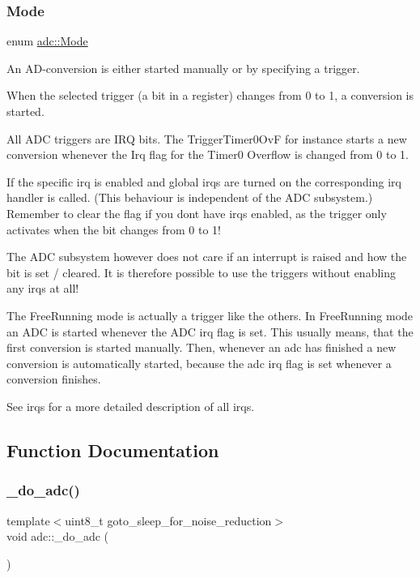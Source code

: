 \subsubsection{\texorpdfstring{Mode}{Mode}}
{\footnotesize\ttfamily enum \hyperlink{namespaceadc_a8094fa55ea1a7729bb35c230163c0f8f}{adc\+::\+Mode}\hspace{0.3cm}{\ttfamily [strong]}}



An A\+D-\/conversion is either started manually or by specifying a trigger. 

When the selected trigger (a bit in a register) changes from 0 to 1, a conversion is started.

All A\+DC triggers are I\+RQ bits. The Trigger\+Timer0\+OvF for instance starts a new conversion whenever the Irq flag for the Timer0 Overflow is changed from 0 to 1.

If the specific irq is enabled and global irqs are turned on the corresponding irq handler is called. (This behaviour is independent of the A\+DC subsystem.) Remember to clear the flag if you don\textquotesingle{}t have irqs enabled, as the trigger only activates when the bit changes from 0 to 1!

The A\+DC subsystem however does not care if an interrupt is raised and how the bit is set / cleared. It is therefore possible to use the triggers without enabling any irqs at all!

The Free\+Running mode is actually a trigger like the others. In Free\+Running mode an A\+DC is started whenever the A\+DC irq flag is set. This usually means, that the first conversion is started manually. Then, whenever an adc has finished a new conversion is automatically started, because the adc irq flag is set whenever a conversion finishes.

See irqs for a more detailed description of all irqs. 

\subsection{Function Documentation}
\hypertarget{namespaceadc_ab569dff590b3bb745fb012aa29ec5723}{}\label{namespaceadc_ab569dff590b3bb745fb012aa29ec5723} 
\subsubsection{\texorpdfstring{\+\_\+do\+\_\+adc()}{\_do\_adc()}}
{\footnotesize\ttfamily template$<$uint8\+\_\+t goto\+\_\+sleep\+\_\+for\+\_\+noise\+\_\+reduction$>$ \\
void adc\+::\+\_\+do\+\_\+adc (\begin{DoxyParamCaption}{ }\end{DoxyParamCaption})}



